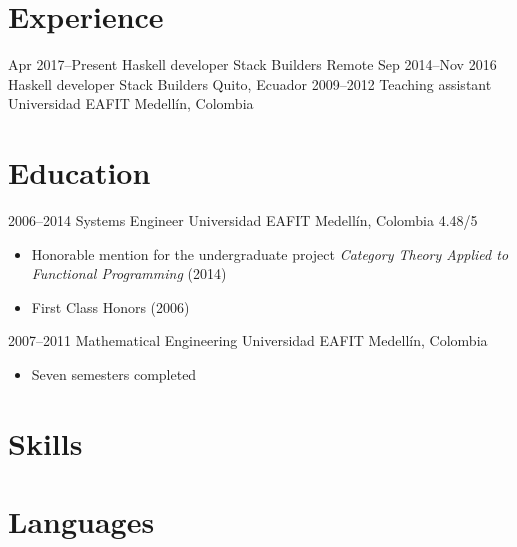 \documentclass[12pt,letterpaper,sans]{moderncv}
\begin{document}
\makecvtitle

\section{Experience}

\cventry
  {Apr 2017--Present}
  {Haskell developer}
  {Stack Builders}
  {Remote}
  {}
  {}
\cventry
  {Sep 2014--Nov 2016}
  {Haskell developer}
  {Stack Builders}
  {Quito, Ecuador}
  {}
  {}
\cventry
  {2009--2012}
  {Teaching assistant}
  {Universidad EAFIT}
  {Medellín, Colombia}
  {}
  {}

\section{Education}

\cventry
  {2006--2014}
  {Systems Engineer}
  {Universidad EAFIT}
  {Medellín, Colombia}
  {4.48/5}
  {
    \begin{itemize}
    \item
      Honorable mention for the undergraduate project \emph{Category
        Theory Applied to Functional Programming} (2014)
    \item
      First Class Honors (2006)
    \end{itemize}
  }
\cventry
  {2007--2011}
  {Mathematical Engineering}
  {Universidad EAFIT}
  {Medellín, Colombia}
  {}
  {
    \begin{itemize}
    \item
      Seven semesters completed
    \end{itemize}
  }

\section{Skills}


\section{Languages}

\end{document}
